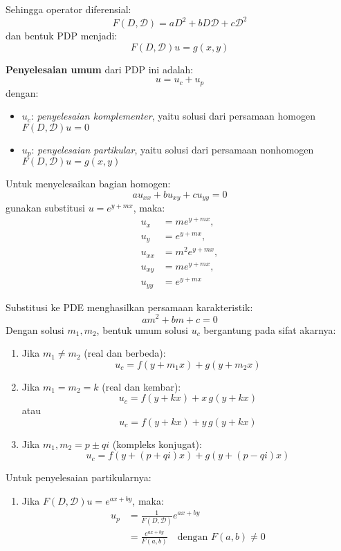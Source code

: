 \documentclass[a4paper,extrafontsizes, 9pt]{memoir}
\begin{document}
\begin{multicols}{3}
Sehingga operator diferensial:
\[
F(D, \mathcal{D}) = a D^2 + b D \mathcal{D} + c \mathcal{D}^2
\]
dan bentuk PDP menjadi:
\[
F(D, \mathcal{D}) u = g(x, y)
\]

\textbf{Penyelesaian umum} dari PDP ini adalah:
\[
u = u_c + u_p
\]
dengan:
\begin{itemize}
    \item \( u_c \): \textit{penyelesaian komplementer}, yaitu solusi dari persamaan homogen \( F(D, \mathcal{D}) u = 0 \)
    \item \( u_p \): \textit{penyelesaian partikular}, yaitu solusi dari persamaan nonhomogen \( F(D, \mathcal{D}) u = g(x, y) \)
\end{itemize}

Untuk menyelesaikan bagian homogen:
\[
a u_{xx} + b u_{xy} + c u_{yy} = 0
\]
gunakan substitusi \( u = e^{y + mx} \), maka:
\begin{align*}
    u_x &= m e^{y + mx}, \\
    u_y &= e^{y + mx}, \\
    u_{xx} &= m^2 e^{y + mx}, \\
    u_{xy} &= m e^{y + mx}, \\
    u_{yy} &= e^{y + mx}
\end{align*}

Substitusi ke PDE menghasilkan persamaan karakteristik:
\[
a m^2 + b m + c = 0
\]
Dengan solusi \( m_1, m_2 \), bentuk umum solusi \( u_c \) bergantung pada sifat akarnya:

\begin{enumerate}
    \item Jika \( m_1 \ne m_2 \) (real dan berbeda):
    \[
    u_c = f(y + m_1 x) + g(y + m_2 x)
    \]
    
    \item Jika \( m_1 = m_2 = k \) (real dan kembar):
    \[
    u_c = f(y + kx) + x\,g(y + kx)
    \]
    atau
    \[
    u_c = f(y + kx) + y\,g(y + kx)
    \]
    
    \item Jika \( m_1, m_2 = p \pm qi \) (kompleks konjugat):
    \[
    u_c = f(y + (p + qi)x) + g(y + (p - qi)x)
    \]
\end{enumerate}

Untuk penyelesaian partikularnya:
\begin{enumerate}
    \item Jika \( F(D, \mathcal{D})u = e^{ax + by} \), maka:
    \begin{align*}
        u_p &= \frac{1}{F(D, \mathcal{D})} e^{ax + by} \\
            &= \frac{e^{ax + by}}{F(a,b)} \quad \text{dengan } F(a,b) \ne 0
    \end{align*}
    

\end{enumerate}
\end{multicols}
\end{document}
